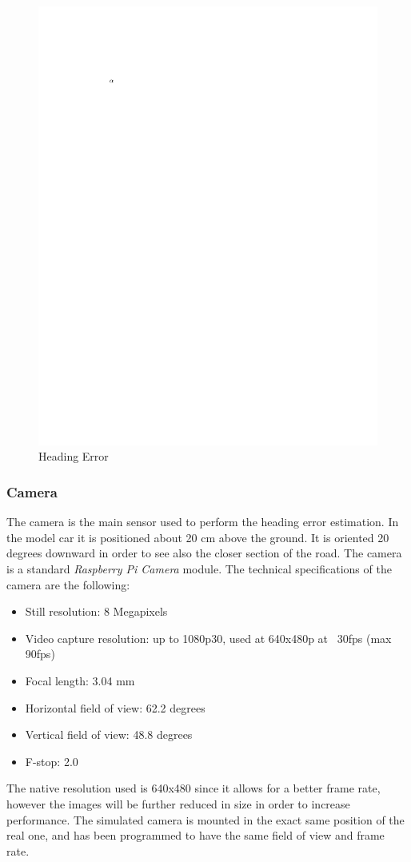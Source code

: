 \documentclass[a4paper,12pt,sort&compress]{article}
\begin{document}
    \begin{figure}
        \centering
        \includegraphics[width=0.6\linewidth]{a.pdf}
        \caption{Heading Error}
        \label{fig:heading_error}
    \end{figure}

    \subsubsection*{Camera}
    The camera is the main sensor used to perform the heading error estimation.
    In the model car it is positioned about 20 cm above the ground. It is oriented 20 degrees downward in order to see also the closer
    section of the road. The camera is a standard \textit{Raspberry Pi Camera}
    module. The technical specifications of the camera are the following:
    \begin{itemize}
        \item Still resolution: 8 Megapixels
        \item Video capture resolution: up to 1080p30, used at 640x480p at
        ~30fps (max 90fps)
        \item Focal length: 3.04 mm
        \item Horizontal field of view: 62.2 degrees
        \item Vertical field of view: 48.8 degrees
        \item F-stop: 2.0
    \end{itemize}
    The native resolution used is 640x480 since it allows for a better
    frame rate, however the images will be further reduced in size in order to
    increase performance. The simulated camera is mounted in the exact same
    position of the real one, and has been programmed to have the same field of
    view and frame rate.  
\end{document}
